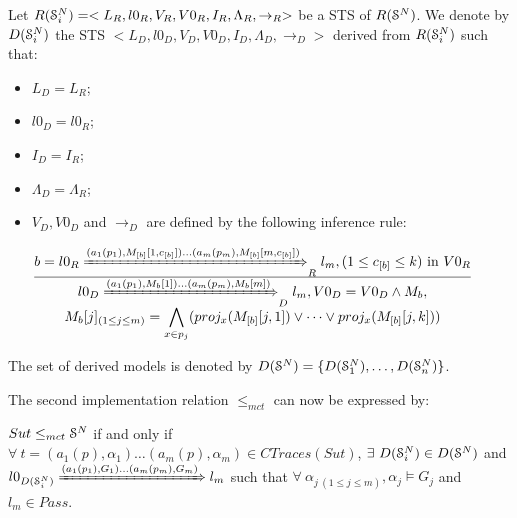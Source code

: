 \begin{definition}
    Let
    $R(\EuScript{S}_i^{N})=<L_R,l0_R,V_R,V0_R,I_R,\Lambda_R,\rightarrow_R>$
    be a STS of $R(\EuScript{S}^{N})$. We denote by
    $D(\EuScript{S}_i^{N})$ the STS $
    <L_D,l0_D,V_D,V0_D,I_D,\Lambda_D,\rightarrow_D>$ derived from
    $R(\EuScript{S}_i^{N})$ such that:

    \begin{itemize}
        \item $L_D=L_{R}$;

        \item $l0_D=l0_{R}$;

        \item $I_D=I_{R}$;

        \item $\Lambda_D=\Lambda_{R}$;

        \item $V_D, V0_D$ and $\rightarrow_D$ are defined by the
            following inference rule:

            $\frac{
                \begin{matrix}
                b=l0_{R}
                \xRightarrow{(a_1(p_1),M_{[b]}[1,c_{[b]}])\dots
                (a_m(p_m),M_{[b]}[m,c_{[b]}])}_{R}
                l_{m},
                (1 \leq c_{[b]} \leq k) \text{ in } V0_{R}
                \end{matrix}
            }
            {
                \begin{matrix}
                l0_D
                \xRightarrow{(a_1(p_1),M_{b}[1])\dots (a_m(p_m),M_{b}[m])}_{D}
                l_m, V0_D=V0_D \wedge M_{b},\\
                M_{b}[j]_{(1\leq j \leq m)} = \displaystyle
                \bigwedge_{x \in p_j} ( proj_x(M_{[b]}[j, 1])
                \vee \dots \vee proj_x(M_{[b]}[j, k]))

                \end{matrix}
            }$
    \end{itemize}

    The set of derived models is denoted by $D(\EuScript{S}^{N}) =
    \{D(\EuScript{S}_1^{N}),\dots,D(\EuScript{S}_n^{N}) \}$.

    \label{def:sts-d}
\end{definition}

The second implementation relation $\leq_{mct}$ can now be
expressed by:

\begin{proposition}
    ${Sut} \leq_{mct} \EuScript{S}^{N}$ if and only if $\forall
    ~t= (a_1(p), \alpha_1) \dots (a_m(p), \alpha_m) \in CTraces({Sut})$,
    $\exists ~D(\EuScript{S}_i^{N}) \in D(\EuScript{S}^{N})$ and
    $l0_{D(\EuScript{S}_i^{N})} \xRightarrow{(a_1(p_1),G_{1})
    \dots (a_m(p_m),G_{m})} l_m$ such that $\forall
    ~\alpha_{j ~(1 \leq j \leq m)}, \alpha_j \models G_{j}$ and
    $l_m \in Pass$.
\end{proposition}

